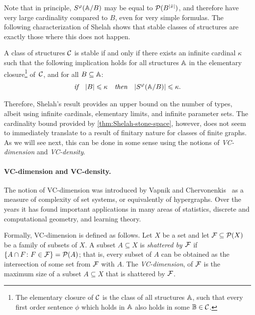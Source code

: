 Note that in principle, $S^\phi(\str A/B)$
may be equal to $\Pow(B^{|\bar x|})$, and therefore have very large cardinality compared to $B$, even for very simple formulas. 
The following characterization of Shelah shows that stable classes of structures are exactly those where this does not happen.
\begin{theorem}[TODO]\label{thm:Shelah-stone-space}
A class of structures $\cal C$
	is stable if and only if 
	there exists 
	an infinite cardinal $\kappa$
	such that the following implication holds for all
	structures
	$\str A$ in the elementary closure\footnote{The elementary closure of $\cal C$ is 
	the class of all structures $\str A$,
	such that  every first order sentence $\phi$
	which holds in $\str A$ also holds in some $\str B\in \cal C$.} of~$\cal C$, and for all $B\subset \str A$:
$$  \textit{if\quad}|B|\le \kappa\textit {\quad then\quad}
|S^\phi(\str A/B)|\le \kappa.$$
\end{theorem}
Therefore,
Shelah's result provides an upper bound on the number of types, albeit using infinite cardinals, elementary limits, and infinite parameter sets.
 The cardinality bound provided by \cref{thm:Shelah-stone-space},
 however, does not seem to  immediately translate to a result of finitary nature for classes of finite graphs. As we will see next,
 this can be done in some sense using the notions of {\em{VC-dimension}} and {\em{VC-density}}.

\paragraph{VC-dimension and VC-density.} The notion of VC-dimension was introduced by 
Vapnik and Chervonenkis~\cite{chervonenkis1971theory} as a measure of complexity of set systems, or equivalently of hypergraphs.
Over the years it
has found important applications in many areas of
statistics, discrete and computational geometry, 
and learning theory. 

Formally, VC-dimension is defined as follows. 
Let $X$ be a set and let  $\FFF\subseteq \Pow(X)$ 
be a family of subsets of $X$.
A subset $A\subseteq X$ is \emph{shattered by $\FFF$} if
$\{A\cap F\colon F\in \FFF\}=\Pow(A)$; that is, every subset of $A$ can be obtained as the intersection of some set from $\FFF$ with $A$. 
The \emph{VC-dimension},
of $\FFF$ is the maximum size of a subset $A\subseteq X$ that is shattered by
$\FFF$.

